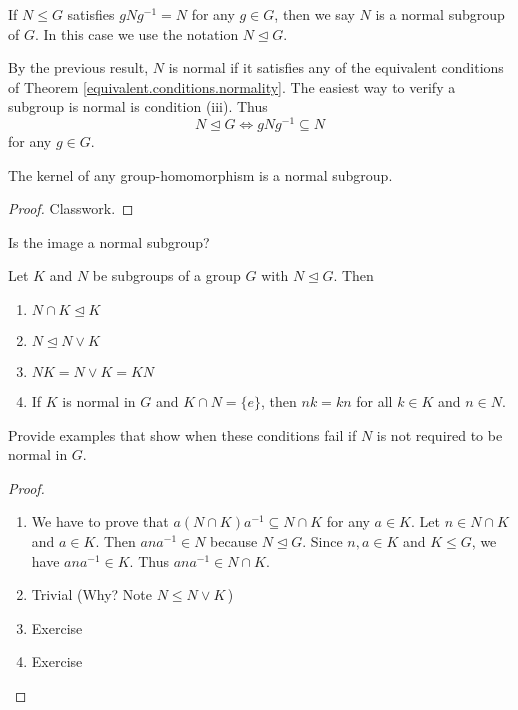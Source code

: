 \documentclass[11pt,a4paper]{article}
\begin{document}
\begin{defi}
    If \(N\leq G\) satisfies  \(gNg^{-1} = N\) for any \(g\in G\), then we say \(N\) is a normal subgroup of \(G\).
    In this case we use the notation \(N \unlhd G\).
\end{defi}

By the previous result, \(N\) is normal if it satisfies any of the equivalent conditions of Theorem \ref{equivalent.conditions.normality}.
The easiest way to verify a subgroup is normal is condition (iii).
Thus 
\[N\unlhd G\iff gNg^{-1}\subseteq N\] 
for any \(g\in G\).

\begin{prop}
    The kernel of any group-homomorphism is a normal subgroup.
\end{prop}

\begin{proof}
    Classwork.
\end{proof}

\begin{que}
    Is the image a normal subgroup?
\end{que}

\begin{teo}\label{thm:k.and.n.subgroups.of.G.and.N.normal}
    Let \(K\) and \(N\) be subgroups of a group \(G\) with \(N\unlhd G\). Then
    \begin{enumerate}[label=(\roman*)]
        \item \(N \cap K\unlhd K\) 
        \item \(N\unlhd N\vee K\)
        \item \(NK = N \vee K = KN\)
        \item If \(K\) is normal in \(G\) and \(K \cap N = \{e\}\), then \(nk = kn\) for all \(k \in K\) and \(n \in N\).
    \end{enumerate}
\end{teo}

\begin{eje}
    Provide examples that show when these conditions fail if \(N\) is not required to be normal in \(G\).
\end{eje}

\begin{proof}
\begin{enumerate}[label=(\roman*)]
    \item We have to prove that \(a (N\cap K) a^{-1}\subseteq N\cap K\) for any \(a\in K\).
     Let \(n \in N\cap K\) and \(a\in K\).
    Then \(ana^{-1}\in N\) because \(N\unlhd G\).
    Since \(n,a\in K\) and \(K\leq G\), we have \(ana^{-1}\in K\).
    Thus \(ana^{-1}\in N\cap K\).
    \item Trivial (Why? Note \(N \leq N \vee K\)\,)
    \item Exercise 
    \item Exercise
\end{enumerate}
\end{proof}
\end{document}
